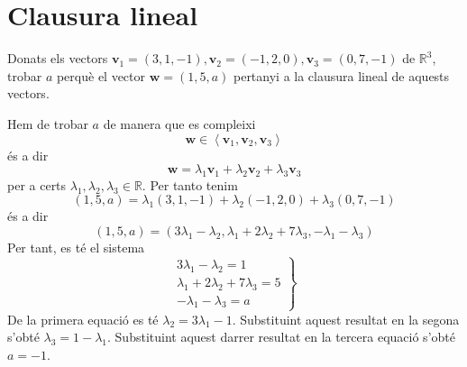 \section{Clausura lineal}

\begin{exercici}
Donats els vectors $\mathbf{v}_{1}=(3,1,-1),\mathbf{v}_{2}=(-1,2,0),\mathbf{v%
}_{3}=(0,7,-1)$ de $\mathbb{R}^{3}$, trobar $a$ perquè el vector $%
\mathbf{w}=(1,5,a)$ pertanyi a la clausura lineal de aquests vectors.

\end{exercici}
\begin{solucio}
Hem de trobar $a$ de manera que es compleixi%
\begin{equation*}
\mathbf{w}\in \left\langle \mathbf{v}_{1},\mathbf{v}_{2},\mathbf{v}%
_{3}\right\rangle
\end{equation*}%
és a dir%
\begin{equation*}
\mathbf{w}=\lambda _{1}\mathbf{v}_{1}+\lambda _{2}\mathbf{v}_{2}+\lambda _{3}%
\mathbf{v}_{3}
\end{equation*}%
per a certs $\lambda _{1},\lambda _{2},\lambda _{3}\in \mathbb{R}$. Per
tanto tenim%
\begin{equation*}
(1,5,a)=\lambda _{1}(3,1,-1)+\lambda _{2}(-1,2,0)+\lambda _{3}(0,7,-1)
\end{equation*}%
és a dir%
\begin{equation*}
(1,5,a)=(3\lambda _{1}-\lambda _{2},\lambda _{1}+2\lambda _{2}+7\lambda
_{3},-\lambda _{1}-\lambda _{3})
\end{equation*}%
Per tant, es té el sistema%
\begin{equation*}
\left.
\begin{array}{r}
3\lambda _{1}-\lambda _{2}=1 \\
\lambda _{1}+2\lambda _{2}+7\lambda _{3}=5 \\
-\lambda _{1}-\lambda _{3}=a%
\end{array}%
\right\}
\end{equation*}%
De la primera equació es té $\lambda _{2}=3\lambda _{1}-1$.
Substituint aquest resultat en la segona s’obté $\lambda _{3}=1-\lambda
_{1}$. Substituint aquest darrer resultat en la tercera equació s'obté $a=-1$.
\end{solucio}

